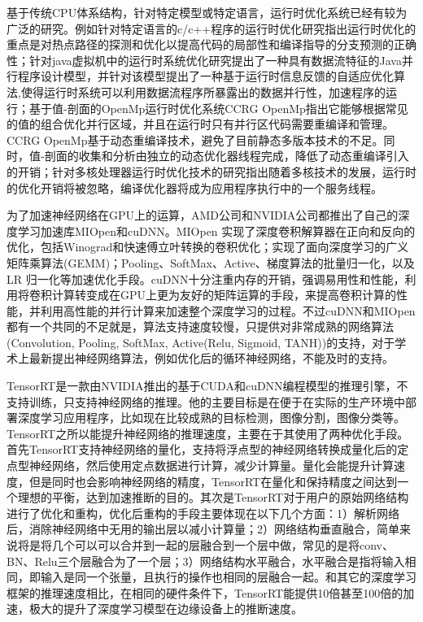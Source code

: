 基于传统CPU体系结构，针对特定模型或特定语言，运行时优化系统已经有较为广泛的研究。例如针对特定语言的c/c++程序的运行时优化研究指出运行时优化的重点是对热点路径的探测和优化以提高代码的局部性和编译指导的分支预测的正确性\cite{zxj}；针对java虚拟机中的运行时系统优化研究提出了一种具有数据流特征的Java并行程序设计模型，并针对该模型提出了一种基于运行时信息反馈的自适应优化算法,使得运行时系统可以利用数据流程序所暴露出的数据并行性，加速程序的运行\cite{fbwcy}；基于值-剖面的OpenMp运行时优化系统CCRG OpenMp指出它能够根据常见的值的组合优化并行区域，并且在运行时只有并行区代码需要重编译和管理。CCRG OpenMp基于动态重编译技术，避免了目前静态多版本技术的不足。同时，值-剖面的收集和分析由独立的动态优化器线程完成，降低了动态重编译引入的开销\cite{hcyxj}；针对多核处理器运行时优化技术的研究指出随着多核技术的发展，运行时的优化开销将被忽略，编译优化器将成为应用程序执行中的一个服务线程\cite{lxy}。

为了加速神经网络在GPU上的运算，AMD公司和NVIDIA公司都推出了自己的深度学习加速库MIOpen\cite{miopen}和cuDNN\cite{cudnn}。MIOpen 实现了深度卷积解算器在正向和反向的优化，包括Winograd和快速傅立叶转换的卷积优化；实现了面向深度学习的广义矩阵乘算法(GEMM)；Pooling、SoftMax、Active、梯度算法的批量归一化，以及LR 归一化等加速优化手段。cuDNN十分注重内存的开销，强调易用性和性能，利用将卷积计算转变成在GPU上更为友好的矩阵运算的手段，来提高卷积计算的性能，并利用高性能的并行计算来加速整个深度学习的过程。不过cuDNN和MIOpen都有一个共同的不足就是，算法支持速度较慢，只提供对非常成熟的网络算法(Convolution, Pooling, SoftMax, Active(Relu, Sigmoid, TANH))的支持，对于学术上最新提出神经网络算法，例如优化后的循环神经网络，不能及时的支持\cite{yzg}。

TensorRT\cite{tensorrt}是一款由NVIDIA推出的基于CUDA\cite{cuda}和cuDNN编程模型的推理引擎，不支持训练，只支持神经网络的推理。他的主要目标是在便于在实际的生产环境中部署深度学习应用程序，比如现在比较成熟的目标检测，图像分割，图像分类等。TensorRT之所以能提升神经网络的推理速度，主要在于其使用了两种优化手段。首先TensorRT支持神经网络的量化，支持将浮点型的神经网络转换成量化后的定点型神经网络，然后使用定点数据进行计算，减少计算量。量化会能提升计算速度，但是同时也会影响神经网络的精度，TensorRT在量化和保持精度之间达到一个理想的平衡，达到加速推断的目的。其次是TensorRT对于用户的原始网络结构进行了优化和重构\cite{tensorrtinference}，优化后重构的手段主要体现在以下几个方面：1）解析网络后，消除神经网络中无用的输出层以减小计算量；2）网络结构垂直融合，简单来说将是将几个可以可以合并到一起的层融合到一个层中做，常见的是将conv、BN、Relu三个层融合为了一个层；3）网络结构水平融合，水平融合是指将输入相同，即输入是同一个张量，且执行的操作也相同的层融合一起。和其它的深度学习框架的推理速度相比，在相同的硬件条件下，TensorRT能提供10倍甚至100倍的加速，极大的提升了深度学习模型在边缘设备上的推断速度。

